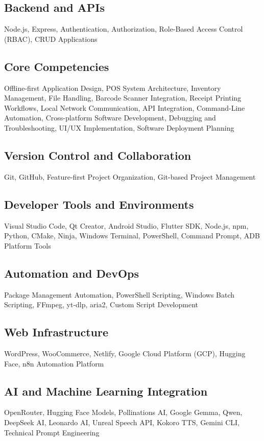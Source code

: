 \documentclass[11pt,letterpaper]{article}
\begin{document}
\subsection*{Backend and APIs}
Node.js, Express, Authentication, Authorization, Role-Based Access Control (RBAC), CRUD Applications

\subsection*{Core Competencies}
Offline-first Application Design, POS System Architecture, Inventory Management, File Handling, Barcode Scanner Integration, Receipt Printing Workflows, Local Network Communication, API Integration, Command-Line Automation, Cross-platform Software Development, Debugging and Troubleshooting, UI/UX Implementation, Software Deployment Planning

\subsection*{Version Control and Collaboration}
Git, GitHub, Feature-first Project Organization, Git-based Project Management

\subsection*{Developer Tools and Environments}
Visual Studio Code, Qt Creator, Android Studio, Flutter SDK, Node.js, npm, Python, CMake, Ninja, Windows Terminal, PowerShell, Command Prompt, ADB Platform Tools

\subsection*{Automation and DevOps}
Package Management Automation, PowerShell Scripting, Windows Batch Scripting, FFmpeg, yt-dlp, aria2, Custom Script Development

\subsection*{Web Infrastructure}
WordPress, WooCommerce, Netlify, Google Cloud Platform (GCP), Hugging Face, n8n Automation Platform

\subsection*{AI and Machine Learning Integration}
OpenRouter, Hugging Face Models, Pollinations AI, Google Gemma, Qwen, DeepSeek AI, Leonardo AI, Unreal Speech API, Kokoro TTS, Gemini CLI, Technical Prompt Engineering
\end{document}
